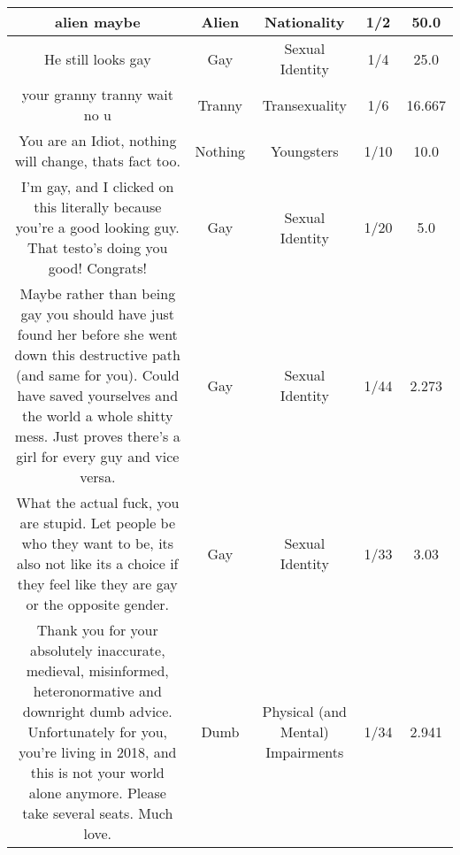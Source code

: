 \documentclass[11pt]{article}
\newlength\mylength
\begin{document}
\begin{center}
\begin{longtable}{|C{.40\mylength}|C{.30\mylength}|C{.15\mylength}|C{.15\mylength}|C{.15\mylength}|}
  alien maybe  & Alien & Nationality & 1/2 & 50.0 \\  \hline
  He still looks gay  & Gay & Sexual Identity & 1/4 & 25.0 \\  \hline
  your granny tranny wait no u  & Tranny & Transexuality & 1/6 & 16.667 \\  \hline
  You are an Idiot, nothing will change, thats fact too.  & Nothing & Youngsters & 1/10 & 10.0 \\  \hline
  I'm gay, and I clicked on this literally because you're a good looking guy. That testo's doing you good! Congrats!  & Gay & Sexual Identity & 1/20 & 5.0 \\  \hline
  Maybe rather than being gay you should have just found her before she went down this destructive path (and same for you). Could have saved yourselves and the world a whole shitty mess. Just proves there's a girl for every guy and vice versa.  & Gay & Sexual Identity & 1/44 & 2.273 \\  \hline
  What the actual fuck, you are stupid. Let people be who they want to be, its also not like its a choice if they feel like they are gay or the opposite gender.  & Gay & Sexual Identity & 1/33 & 3.03 \\  \hline
  Thank you for your absolutely inaccurate, medieval, misinformed, heteronormative and downright dumb advice. Unfortunately for you, you're living in 2018, and this is not your world alone anymore. Please take several seats. Much love.  & Dumb & Physical (and Mental) Impairments & 1/34 & 2.941 \\  \hline

\end{longtable}
\end{center}
\end{document}
